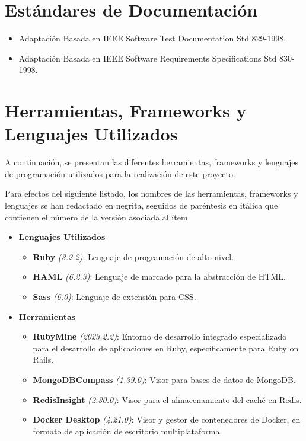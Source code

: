\section{Estándares de Documentación}
\begin{itemize}
	\item Adaptación Basada en IEEE Software Test Documentation Std 829-1998.
	\item Adaptación Basada en IEEE Software Requirements Specifications Std 830-1998.
\end{itemize}

\section{Herramientas, Frameworks y  Lenguajes Utilizados}
A continuación, se presentan las diferentes herramientas, frameworks y lenguajes de programación utilizados para la realización de este proyecto.

Para efectos del siguiente listado, los nombres de las herramientas, frameworks y lenguajes se han redactado en negrita, seguidos de paréntesis en itálica que contienen el número de la versión asociada al ítem.

\begin{itemize}
	\item[] \textbf{Lenguajes Utilizados}
	\begin{itemize}
		\item \textbf{Ruby} \textit{(3.2.2)}: Lenguaje de programación de alto nivel.
		\item \textbf{HAML} \textit{(6.2.3)}: Lenguaje de marcado para la abstracción de HTML.
		\item \textbf{Sass} \textit{(6.0)}: Lenguaje de extensión para CSS.
	\end{itemize}
\end{itemize}

\begin{itemize}
	\item[] \textbf{Herramientas}
	\begin{itemize}
		\item \textbf{RubyMine} \textit{(2023.2.2)}: Entorno de desarrollo integrado especializado para el desarrollo de aplicaciones en Ruby, específicamente para Ruby on Rails.
		\item \textbf{MongoDBCompass} \textit{(1.39.0)}: Visor para bases de datos de MongoDB.
		\item \textbf{RedisInsight} \textit{(2.30.0)}: Visor para el almacenamiento del caché en Redis.
		\item \textbf{Docker Desktop} \textit{(4.21.0)}: Visor y gestor de contenedores de Docker, en formato de aplicación de escritorio multiplataforma.
	\end{itemize}
\end{itemize}



